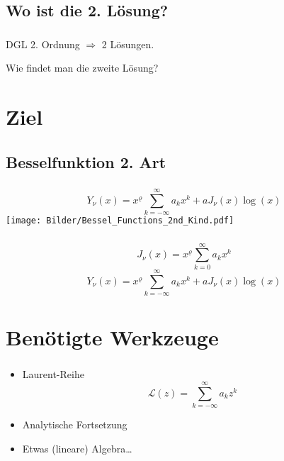 \documentclass{beamer}
\newenvironment{slide}
{\begin{frame}[environment=slide]
	\frametitle{\insertsection}
	\framesubtitle{\insertsubsection}}
{\end{frame}}
\begin{document}
\subsection{Wo ist die 2. Lösung?}
	\begin{slide}		
		DGL 2. Ordnung $\Rightarrow$ 2 Lösungen.
		
		Wie findet man die zweite Lösung?
		
	\end{slide}

\section{Ziel}

\subsection{Besselfunktion 2. Art}
\begin{slide}
	\centering
	$$Y_\nu(x)=x^\varrho\sum_{k=-\infty}^{\infty}a_kx^k+aJ_\nu(x)\log(x)$$
	\texttt{[image: Bilder/Bessel\_Functions\_2nd\_Kind.pdf]}
\end{slide}

\begin{slide}
	$$J_\nu(x)=x^\varrho\sum_{k=0}^{\infty}a_kx^k$$
	$$Y_\nu(x)=x^\varrho\sum_{k=-\infty}^{\infty}a_kx^k+aJ_\nu(x)\log(x) $$
	\begin{figure}
	\end{figure}
\end{slide}

\section{Benötigte Werkzeuge}
	\begin{slide}
		\begin{itemize}
			\item Laurent-Reihe
			$$\mathcal{L}(z)=\sum_{k=-\infty}^{\infty}a_kz^k $$
			\item Analytische Fortsetzung
			\item Etwas (lineare) Algebra\ldots
		\end{itemize}
	\end{slide}
	
\end{document}
